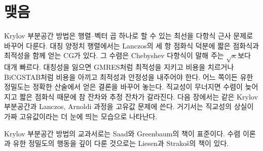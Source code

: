 \section{맺음}

Krylov 부분공간 방법은 행렬--벡터 곱 하나로 할 수 있는 최선을 다항식 근사 문제로 바꾸어 다룬다. 대칭 양정치 행렬에서는 Lanczos의 세 항 점화식 덕분에 짧은 점화식과 최적성을 함께 얻는 CG가 있다. 그 수렴은 Chebyshev 다항식이 말해 주는 $\sqrt\kappa$보다 대개 빠르다. 대칭성을 잃으면 GMRES처럼 최적성을 지키고 비용을 치르거나 BiCGSTAB처럼 비용을 아끼고 최적성과 안정성을 내주어야 한다. 어느 쪽이든 유한 정밀도는 정확한 산술에서 얻은 결론을 바꾸어 놓는다. 직교성이 무너지면 수렴이 늦어지고 짧은 점화식 때문에 참 잔차와 추정 잔차가 갈라진다. 다음 장에서는 같은 Krylov 부분공간과 Lanczos, Arnoldi 과정을 고유값 문제에 쓴다. 거기서는 직교성의 상실이 가짜 고유값이라는 더 눈에 띄는 모습으로 나타난다.

Krylov 부분공간 방법의 교과서로는 Saad\cite{saad2003iterative}와 Greenbaum\cite{greenbaum1997iterative}의 책이 표준이다. 수렴 이론과 유한 정밀도의 행동을 깊이 다룬 것으로는 Liesen과 Strakoš의 책\cite{liesen2013krylov}이 있다.

\chapterreferences

